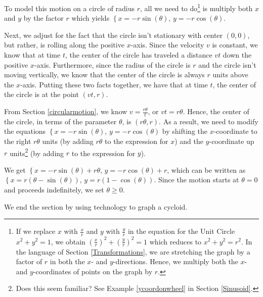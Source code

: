 \documentclass{ximera}
\begin{document}
 

To model this motion on a circle of radius $r$, all we need to do\footnote{If we replace $x$ with $\frac{x}{r}$ and $y$ with $\frac{y}{r}$ in the equation for the Unit Circle $x^2+y^2 = 1$, we obtain $\left(\frac{x}{r}\right)^2 + \left(\frac{y}{r}\right)^2 = 1$ which reduces to $x^2 + y^2 = r^2$.  In the language of Section \ref{Transformations}, we are stretching the graph by a factor of $r$ in both the $x$- and $y$-directions. Hence,  we multiply both the $x$- and $y$-coordinates of points on the graph by $r$.} is multiply both $x$ and $y$ by the factor $r$ which yields $\left\{ x = -r\sin(\theta), \, y = -r\cos(\theta) \right.$.  

 

Next, we  adjust for the fact that the circle isn't stationary with center $(0,0)$, but rather, is rolling along the positive $x$-axis.  Since the velocity $v$ is constant, we know that at time $t$, the center of the circle has traveled a distance $vt$ down the positive $x$-axis.  Furthermore, since the radius of the circle is $r$ and the circle isn't moving vertically, we know that the center of the circle is always $r$ units above the $x$-axis.   Putting these two facts together, we have that at time $t$, the center of the circle is at the point $(vt,r)$. 

 

From Section \ref{circularmotion}, we know $v = \frac{r \theta}{t}$, or $vt = r\theta$.  Hence, the center of the circle, in terms of the parameter $\theta$, is $(r\theta,r)$. As a result, we need to modify the equations $\left\{ x = -r\sin(\theta), \, y = -r\cos(\theta) \right.$  by shifting the $x$-coordinate to the right $r\theta$ units (by adding $r\theta$ to the expression for $x$) and the $y$-coordinate up $r$ units\footnote{Does this seem familiar?  See Example \ref{ycoordonwheel} in Section \ref{Sinusoid}.} (by adding $r$ to the expression for $y$).  

 

We get $\left\{ x = -r\sin(\theta)+ r\theta, \, y = -r\cos(\theta) + r \right.$, which can be written as $\left\{ x = r(\theta -\sin(\theta)), \, y = r(1-\cos(\theta)) \right.$. Since the motion starts at $\theta = 0$ and proceeds indefinitely, we set  $\theta \geq 0$.  

 

We end the section by using technology to graph a cycloid.
\end{document}
